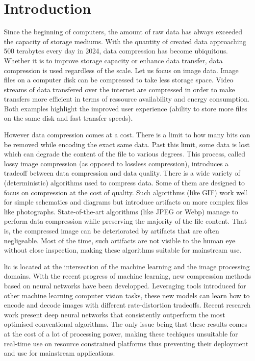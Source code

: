 \chapter*{Introduction}
Since the beginning of computers, the amount of raw data has always exceeded the capacity of storage mediums. With the quantity of created data approaching 500 terabytes every day in 2024, data compression has become ubiquitous. Whether it is to improve storage capacity or enhance data transfer, data compression is used regardless of the scale. Let us focus on image data. Image files on a computer disk can be compressed to take less storage space. Video streams of data transfered over the internet are compressed in order to make transfers more efficient in terms of ressource availability and energy consumption. Both examples highlight the improved user experience (ability to store more files on the same disk and fast transfer speeds).

However data compression comes at a cost. There is a limit to how many bits can be removed while encoding the exact same data. Past this limit, some data is lost which can degrade the content of the file to various degrees. This process, called lossy image compression (as opposed to lossless compression), introduces a tradeoff between data compression and data quality. There is a wide variety of (deterministic) algorithms used to compress data. Some of them are designed to focus on compression at the cost of quality. Such algorithms (like GIF) work well for simple schematics and diagrams but introduce artifacts on more complex files like photographs. State-of-the-art algorithms (like JPEG or Webp) manage to perform data compression while preserving the majority of the file content. That is, the compressed image can be deteriorated by artifacts that are often negligeable. Most of the time, such artifacts are not visible to the human eye without close inspection, making these algorithms suitable for mainstream use.

\acrfull{lic} is located at the intersection of the machine learning and the image processing domains. With the recent progress of machine learning, new compression methods based on neural networks have been developped. Leveraging tools introduced for other machine learning computer vision tasks, these new models can learn how to encode and decode images with different rate-distortion tradeoffs. Recent research work present deep neural networks that consistently outperform the most optimised conventional algorithms. The only issue being that these results comes at the cost of a lot of processing power, making these techiques unsuitable for real-time use on resource constrained platforms thus preventing their deployment and use for mainstream applications.

